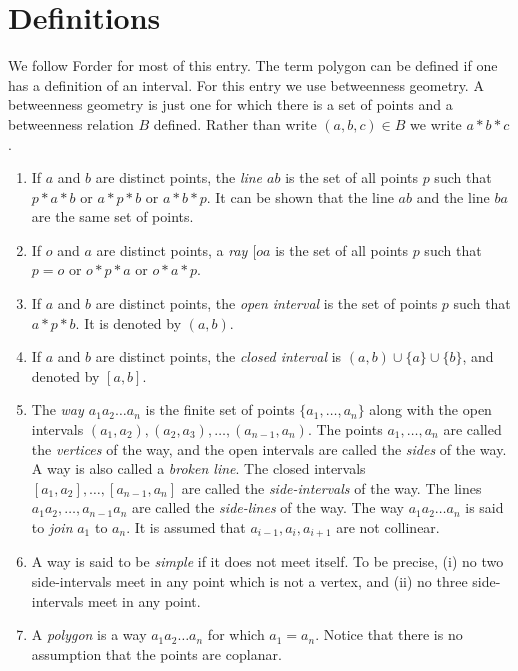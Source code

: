 \documentclass{article}
\begin{document}

\section{Definitions}
We follow Forder \cite{forder} for most of this entry.
The term polygon can be defined if  one has a definition of an interval. For this 
entry we use betweenness geometry. A betweenness geometry
is just one for which there is a set of points and a betweenness relation $B$ defined.
Rather than write $(a,b,c) \in B$ we write $a*b*c$.

\begin{enumerate}
\item If $a$ and $b$ are distinct points, the \emph{line $ab$} is the set of
all points $p$ such that $p*a*b$ or $a*p*b$ or $a*b*p$. It can be shown
that the line $ab$ and the line $ba$ are the same set of points. 
\item If $o$ and $a$ are distinct points, a \emph{ray $[oa$} is the set of all points $p$ such that 
$p=o$ or $o*p*a$ or $o*a*p$. 
\item If $a$ and $b$ are distinct points, the \emph{open interval} is the set of points
$p$ such that $a*p*b$. It is denoted by $(a,b).$
\item If $a$ and $b$ are distinct points, the \emph{closed interval} is 
$(a,b) \cup \{a\} \cup \{b\}$, and denoted by $[a,b].$
\item The \emph{way $a_1a_2\ldots a_n$} is the finite set of points $\{a_1, \ldots , a_n\}$
along with the open intervals $(a_1, a_2), (a_2,a_3), \ldots, (a_{n-1}, a_n)$.
The points $a_1, \ldots, a_n$ are called the \emph{vertices} of the way, and the
open intervals are called the \emph{sides} of the way. 
A way is also called a \emph{broken line}.
The closed intervals $[a_1,a_2], \ldots, [a_{n-1},a_n]$ are called the \emph{side-intervals} of
the way. The lines $a_1a_2, \ldots , a_{n-1}a_n$ are called the \emph{side-lines}
of the way. 
The way  $a_1a_2\ldots a_n$ is said to \emph{join} $a_1$ to $a_n$.
It is assumed that $a_{i-1}, a_i, a_{i+1}$ are not collinear. 
\item A way is said to be \emph{simple} if it does not meet itself. To be precise,
(i) no two side-intervals meet in any point which is not a vertex, and (ii) no three side-intervals
meet in any point. 
\item A \emph{polygon} is a way $a_1 a_2 \ldots a_n$ for which $a_1 = a_n$. Notice that there is
no assumption that the points are coplanar. 

\end{enumerate}
\end{document}
